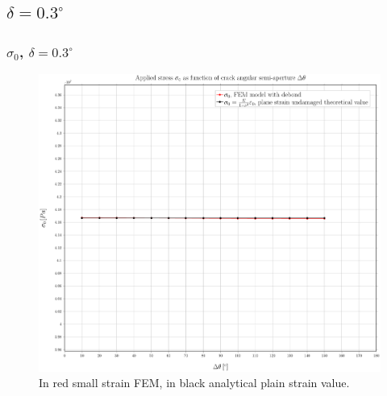 \documentclass[first,firstsupp,lastsupp,handout,last,hyperref,table]{ETHclass}
\begin{document}

\subsection{$\delta=0.3^{\circ}$}

\begin{frame}
\frametitle{\small $\sigma_{0}$, $\delta=0.3^{\circ}$}
\vspace{-0.5cm}
\centering
\captionsetup[figure]{font=scriptsize,labelfont=scriptsize}
\begin{figure}[!h]
\centering
\includegraphics[height=0.7\textheight]{2017-07-10_AbqRunSummary_SmallStrainD03_sigma-inf_Summary.pdf}
  \caption{\scriptsize In red small strain FEM, in black analytical plain strain value.}
  \label{fig:res1}
\end{figure}
\end{frame}
\end{document}
